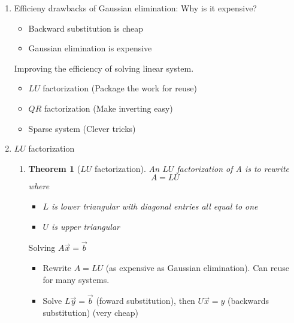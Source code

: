 \documentclass{article}
\newtheorem{thm}{Theorem}[section]
\theoremstyle{remark}
\begin{document}
\begin{enumerate}
\item Efficieny drawbacks of Gaussian elimination: Why is it expensive?
\begin{itemize}
\item Backward substitution is cheap
\item Gaussian elimination is expensive
\end{itemize}
Improving the efficiency of solving linear system. 
\begin{itemize}
\item $LU$ factorization (Package the work for reuse)
\item $QR$ factorization (Make inverting easy)
\item Sparse system (Clever tricks)
\end{itemize}

\item $LU$ factorization
\begin{enumerate}
\item 
\begin{thm}[$LU$ factorization]
 An $LU$ factorization of A is to rewrite
 $$
 A = LU
 $$
 where
 \begin{itemize}
\item $L$ is lower triangular with diagonal entries all equal to one
\item $U$ is upper triangular
\end{itemize}
\end{thm}
Solving $A\vec x = \vec b$
\begin{itemize}
\item Rewrite $A = LU$ (as expensive as Gaussian elimination). Can reuse for many systems.
\item Solve $L\vec y = \vec b$ (foward substitution), then $U\vec x = y$ (backwards substitution) (very cheap)
\end{itemize}


\end{enumerate}
\end{enumerate}
\end{document}
